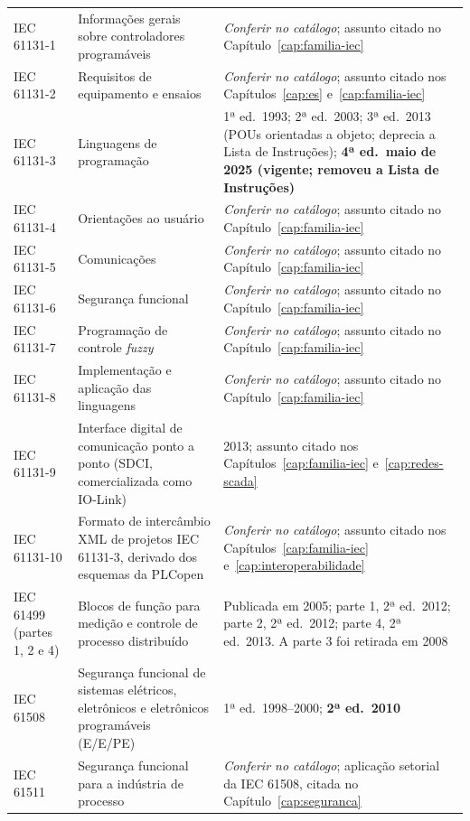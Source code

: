 \begin{longtable}{p{3.6cm} p{5.0cm} p{6.4cm}}
  IEC 61131-1 & Informações gerais sobre controladores programáveis &
    \emph{Conferir no catálogo}; assunto citado no Capítulo~\ref{cap:familia-iec} \\
  IEC 61131-2 & Requisitos de equipamento e ensaios &
    \emph{Conferir no catálogo}; assunto citado nos Capítulos~\ref{cap:es} e~\ref{cap:familia-iec} \\
  IEC 61131-3 & Linguagens de programação &
    1ª ed.\ 1993; 2ª ed.\ 2003; 3ª ed.\ 2013 (POUs orientadas a objeto; deprecia a Lista de
    Instruções); \textbf{4ª ed.\ maio de 2025 (vigente; removeu a Lista de Instruções)} \\
  IEC 61131-4 & Orientações ao usuário &
    \emph{Conferir no catálogo}; assunto citado no Capítulo~\ref{cap:familia-iec} \\
  IEC 61131-5 & Comunicações &
    \emph{Conferir no catálogo}; assunto citado no Capítulo~\ref{cap:familia-iec} \\
  IEC 61131-6 & Segurança funcional &
    \emph{Conferir no catálogo}; assunto citado no Capítulo~\ref{cap:familia-iec} \\
  IEC 61131-7 & Programação de controle \emph{fuzzy} &
    \emph{Conferir no catálogo}; assunto citado no Capítulo~\ref{cap:familia-iec} \\
  IEC 61131-8 & Implementação e aplicação das linguagens &
    \emph{Conferir no catálogo}; assunto citado no Capítulo~\ref{cap:familia-iec} \\
  IEC 61131-9 & Interface digital de comunicação ponto a ponto (SDCI, comercializada como IO-Link) &
    2013; assunto citado nos Capítulos~\ref{cap:familia-iec} e~\ref{cap:redes-scada} \\
  IEC 61131-10 & Formato de intercâmbio XML de projetos IEC 61131-3, derivado dos esquemas da PLCopen &
    \emph{Conferir no catálogo}; assunto citado nos Capítulos~\ref{cap:familia-iec}
    e~\ref{cap:interoperabilidade} \\
  IEC 61499 (partes 1, 2 e 4) & Blocos de função para medição e controle de processo distribuído &
    Publicada em 2005; parte 1, 2ª ed.\ 2012; parte 2, 2ª ed.\ 2012; parte 4, 2ª ed.\ 2013. A parte 3
    foi retirada em 2008 \\
  IEC 61508 & Segurança funcional de sistemas elétricos, eletrônicos e eletrônicos programáveis
    (E/E/PE) &
    1ª ed.\ 1998--2000; \textbf{2ª ed.\ 2010} \\
  IEC 61511 & Segurança funcional para a indústria de processo & \emph{Conferir no catálogo};
    aplicação setorial da IEC 61508, citada no Capítulo~\ref{cap:seguranca} \\

\end{longtable}
